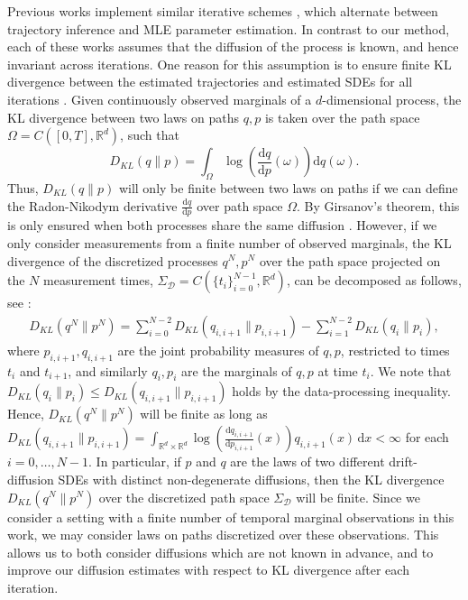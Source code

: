 \documentclass[twoside,11pt]{article}
\newcommand{\R} {\mathbb R}
\begin{document}
Previous works implement similar iterative schemes \citep{zhang2024joint, shen2024multi, vargas2021solving}, which alternate between trajectory inference and MLE parameter estimation. In contrast to our method, each of these works assumes that the diffusion of the process is known, and hence invariant across iterations. One reason for this assumption is to ensure finite KL divergence between the estimated trajectories and estimated SDEs for all iterations \citep{vargas2021solving}. Given continuously observed marginals of a $d$-dimensional process, the KL divergence between two laws on paths $q, p$ is taken over the path space $\Omega = C([0,T], \R^d)$, such that
$$
D_{KL}(q\| p)= \int_{\Omega} \log\left(\frac{\mathrm{d}q}{\mathrm{d}p}(\omega) \right)\mathrm{d}q(\omega).
$$
Thus, $D_{KL}(q\| p)$ will only be finite between two laws on paths if we can define the Radon-Nikodym derivative $\frac{\mathrm{d}q}{\mathrm{d}p}$ over path space $\Omega$. By Girsanov's theorem, this is only ensured when both processes share the same diffusion \citep{shen2024multi, vargas2021solving}. However, if we only consider measurements from a finite number of observed marginals, the KL divergence of the discretized processes $q^N, p^N$ over the path space projected on the $N$ measurement times, $\Sigma_\mathcal{D}= C(\{t_i\}_{i=0}^{N-1}, \R^d)$, can be decomposed as follows, see \citet{benamou2019entropy}:
\begin{align}
\label{eq:discretized_KL}
D_{KL}(q^{N}\| p^{N})=\sum_{i=0}^{N-2}D_{KL}(q_{i, i+1}\| p_{i, i+1}) - \sum_{i=1}^{N-2}D_{KL}(q_i\| p_i),
\end{align}
where $p_{i, i+1}, q_{i, i+1}$ are the joint probability measures of $q, p$, restricted to times $t_i$ and $t_{i+1}$, and similarly $q_i,p_i$ are the marginals of $q,p$ at time $t_i$. We note that $D_{KL}(q_i \| p_i)\leq D_{KL}(q_{i, i+1}\| p_{i, i+1})$ holds by the data-processing inequality. Hence, $D_{KL}(q^{N}\| p^{N})$ will be finite as long as $D_{KL}(q_{i, i+1}\| p_{i, i+1}) = \int_{\R^d \times \R^d} \log\left(\frac{\mathrm{d}q_{i, i+1}}{\mathrm{d}p_{i, i+1}}(x) \right) q_{i, i+1}(x) \, \mathrm{d}x < \infty$ for each $i=0, \ldots, N-1$.  In particular, if $p$ and $q$ are the laws of two different drift-diffusion SDEs with distinct non-degenerate diffusions, then the KL divergence  $D_{KL}(q^N\| p^N)$ over the discretized path space $\Sigma_\mathcal{D}$ will be finite. Since we consider a setting with a finite number of temporal marginal observations in this work, we may consider laws on paths discretized over these observations. This allows us to both consider diffusions which are not known in advance, and to improve our diffusion estimates with respect to KL divergence after each iteration.
\end{document}
